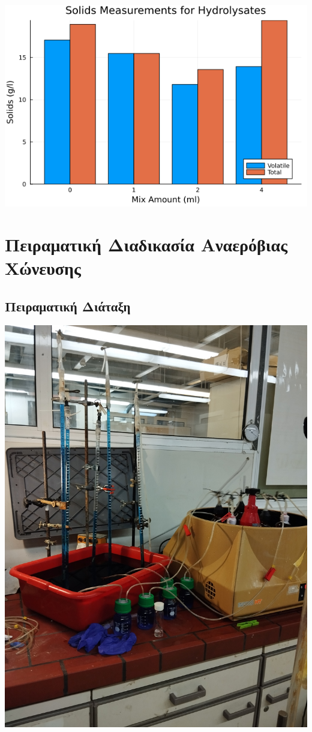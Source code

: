 \documentclass[11pt]{article}
\begin{document}
\begin{center}
\includegraphics[width=.9\linewidth]{../plots/26_03/ts_vs_bar_plot_26_03.png}
\end{center}

\section{Πειραματική Διαδικασία Αναερόβιας Χώνευσης}
\label{sec:orgf4196f1}
\subsection{Πειραματική Διάταξη}
\label{sec:org51c0b6c}
\begin{center}
\includegraphics[width=.9\linewidth]{IMG_20240327_185818.jpg}
\end{center}
\end{document}
